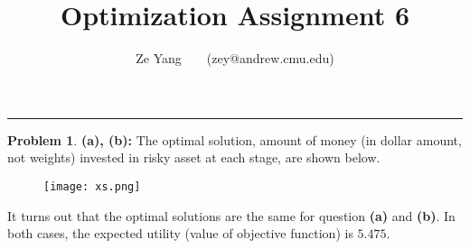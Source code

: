 \documentclass[a4paper, 8pt]{article}
\title{\textbf{Optimization Assignment 6}}
\author{Ze Yang~~~~(zey@andrew.cmu.edu)}
\theoremstyle{definition}
\newtheorem{problem}{Problem}
\theoremstyle{hSol}
\begin{document}
\maketitle

\noindent\rule{16cm}{0.4pt}
\begin{problem} \textbf{(a), (b):} The optimal solution, amount of money (in dollar amount, not weights) invested in risky asset at each stage, are shown below.
\end{problem}
\begin{figure}[H]
  \centering
  \texttt{[image: xs.png]}
  \vspace{25pt}
\end{figure}
It turns out that the optimal solutions are the same for question \textbf{(a)} and \textbf{(b)}. In both cases, the expected utility (value of objective function) is $5.475$.
\end{document}
